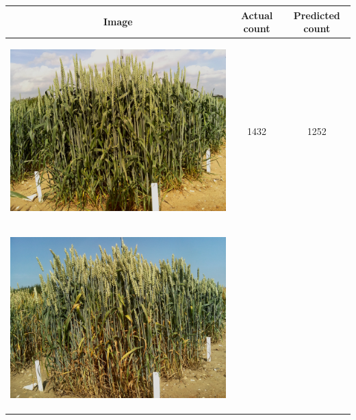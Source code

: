 \begin{table}[hp!]
  \centering
  \begin{tabular}{ | c | c | c | }
    \hline
    Image & Actual count & Predicted count \\ \hline
    \begin{minipage}{.3\textwidth}
      \begin{center}
		\includegraphics[width=\linewidth]{Images/001}
      \end{center}
    \end{minipage}
    &
      1432
    & 
      1252
    \\ \hline
    \begin{minipage}{.3\textwidth}
      \begin{center}
		\includegraphics[width=\linewidth]{Images/002}

\end{center}
\end{minipage}
\end{tabular}
\end{table}
